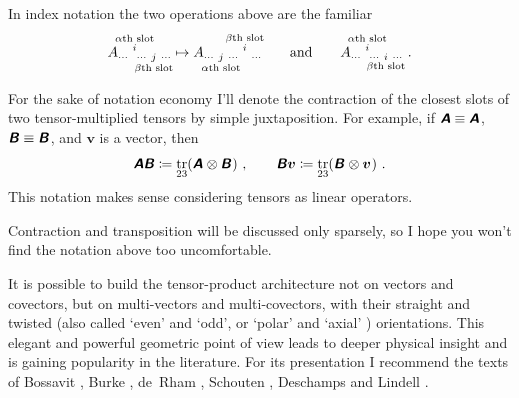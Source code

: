 \documentclass[\ifafour a4paper,12pt,\else a5paper,10pt,\fi%
onecolumn,oneside,article,%
british%
]{memoir}
\makeatletter
\newcommand*{\defquote}[1]{`#1'}
\theoremstyle{remark}
\theoremstyle{innote}
\newcommand*{\mathte}[1]{\textbf{\textit{\textsf{#1}}}}
\newcommand*{\citep}{\footcites}
\newcommand*{\citey}{\parencites*}%
\DeclareMathOperator{\tr}{tr}%
\newcommand*{\defd}{\coloneqq}
\renewcommand*{\|}[1][]{\nonscript\,#1\vert\nonscript\;\mathopen{}}
\newcommand*{\chap}{ch.}%
\newcommand*{\q}{}%
\DeclareRobustCommand*{\q}{%
  \mathord{\mathpalette\bigcdot@{}}%
}
\newcommand*{\bigcdot@scalefactor}{0.7}
\newcommand*{\bigcdot@widthfactor}{1.5}
\newcommand*{\bigcdot@}[2]{%
  \sbox0{$#1\vcenter{}$}%
  \sbox2{$#1\cdot\m@th$}%
  \hbox to \bigcdot@widthfactor\wd2{%
    \hfil
    \raise\ht0\hbox{%
      \scalebox{\bigcdot@scalefactor}{%
        \lower\ht0\hbox{$#1\bullet\m@th$}%
      }%
    }%
    \hfil
  }%
}
\newcommand*{\yA}{\mathte{A}}
\newcommand*{\yB}{\mathte{B}}
\newcommand*{\yv}{\bm{v}}
\renewcommand*{\i}{\indices}
\makeatother
\begin{document}
In index notation the two operations above are the familiar
\begin{equation*}
  A\i{_{\dotsm\ }^{%
      \overset{\mathclap{\scriptstyle\text{$\alpha$th slot}}}{i}
    }_{\dotsm\ %
      \underset{\mathclap{\scriptstyle\text{$\beta$th slot}}}{j}
      \ \dotsm}}
  \mapsto
  A\i{_{\dotsm\ %
      \underset{\mathclap{\scriptstyle\text{$\alpha$th slot}}}{j}
      \ \dotsm\ }^{%
      \overset{\mathclap{\scriptstyle\text{$\beta$th slot}}}{i}
    }_{\ \dotsm}} 
  \qquad\text{and}\qquad
  A\i{_{\dotsm\ }^{%
      \overset{\mathclap{\scriptstyle\text{$\alpha$th slot}}}{i}
    }_{\dotsm\ %
      \underset{\mathclap{\scriptstyle\text{$\beta$th slot}}}{i}
      \ \dotsm}} \ .
\end{equation*}

For the sake of notation economy I'll denote the contraction of the closest
slots of two tensor-multiplied tensors by simple juxtaposition. For
example, if $\yA \equiv \yA\i{_{\q}^{\q}}$, $\yB \equiv \yB\i{_{\q\q}}$,
and $\yv$ is a vector, then
\begin{equation}
  \label{eq:simple_contraction}
  \yA\yB \defd \tr_{23}(\yA\i{_{\q}^{\q}}\otimes\yB\i{_{\q\q}})\ ,
  \qquad
  \yB\yv \defd \tr_{23}(\yB\i{_{\q\q}} \otimes \yv\i{^{\q}}) \ .
\end{equation}
This notation makes sense considering tensors as linear operators.

Contraction and transposition will be discussed only sparsely, so I hope
you won't find the notation above too uncomfortable.


\bigskip


It is possible to build the tensor-product architecture not on vectors and
covectors, but on multi-vectors and multi-covectors, with their straight
and twisted (also called \defquote{even} and
\defquote{odd}, %
or \defquote{polar} and \defquote{axial}%
) orientations. This elegant and powerful geometric point of view leads to
deeper physical insight and is gaining popularity in the literature. For
its presentation I recommend the texts of Bossavit \citey[especially
\chap~3]{bossavit1991}, Burke
\citey{burke1983,burke1985_r1987,burke1980b,burke1995}, de~Rham
\citey[\chap~2]{derham1955_t1984}, Schouten \citey{schouten1924_r1954},
Deschamps \citey{deschamps1970,deschamps1981} and Lindell
\citey{lindell2004}.
\end{document}
